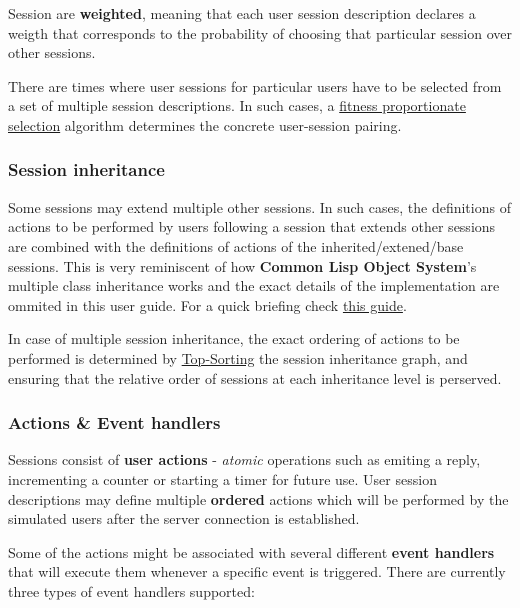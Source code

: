 \documentclass[a4paper]{article}
\begin{document}
Session are \textbf{weighted}, meaning that each user session description declares a weigth that corresponds to the probability of choosing that particular session over other sessions.

\noindent
There are times where user sessions for particular users have to be selected from a set of multiple session descriptions. In such cases, a \href{http://en.wikipedia.org/wiki/Fitness_proportionate_selection}{fitness proportionate selection} algorithm determines the concrete user-session pairing.
\subsubsection{Session inheritance}
\label{sec-2-2-2}

Some sessions may extend multiple other sessions. In such cases, the definitions of actions to be performed by users following a session that extends other sessions are combined with the definitions of actions of the inherited/extened/base sessions. This is very reminiscent of how \textbf{Common Lisp Object System}'s multiple class inheritance works and the exact details of the implementation are ommited in this user guide. For a quick briefing check \href{http://www.n-a-n-o.com/lisp/cmucl-tutorials/CLOS-guide-5.html}{this guide}.

\noindent
In case of multiple session inheritance, the exact ordering of actions to be performed is determined by \href{https://en.wikipedia.org/wiki/Topological_sorting}{Top-Sorting} the session inheritance graph, and ensuring that the relative order of sessions at each inheritance level is perserved.
\subsubsection{Actions \& Event handlers}
\label{sec-2-2-3}

Sessions consist of \textbf{user actions} - \emph{atomic} operations such as emiting a reply, incrementing a counter or starting a timer for future use. User session descriptions may define multiple \textbf{ordered} actions which will be performed by the simulated users after the server connection is established.

\noindent
Some of the actions might be associated with several different \textbf{event handlers} that will execute them whenever a specific event is triggered. There are currently three types of event handlers supported:
\end{document}
